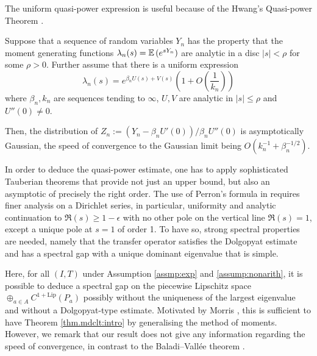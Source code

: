 \documentclass[12pt,a4paper,reqno]{amsart}
\newcommand{\tcb}{\textcolor{blue}}
\begin{document}
The uniform quasi-power expression is useful because of the Hwang's Quasi-power Theorem \cite{Hwang}.
\begin{theorem}
Suppose that a sequence of random variables $Y_n$ has the property that the moment generating functions $\lambda_n(s) = {\mathbb E}\,(e^{sY_n})$ are analytic in a disc $|s| < \rho$ for some $\rho >0$. Further assume that there is a uniform expression
\[
\lambda_n(s) = e^{\beta_n  U(s) + V(s)}\left( 1 + O\left(\frac{1}{k_n} \right)\right)
\]
where $\beta_n, k_n$ are sequences tending to $\infty$, $U,V$ are analytic in $|s| \le \rho$ and $U''(0) \neq 0$.

Then, the distribution of $Z_n :=  (Y_n - \beta_n U'(0))/ \beta_n U''(0)$ is asymptotically Gaussian, the speed of convergence to the Gaussian limit being $O(k_n^{-1} + \beta_n^{-1/2})$.
\end{theorem}

In order to deduce the quasi-power estimate, one has to apply sophisticated Tauberian theorems that provide not just an upper bound, but also an asymptotic of precisely the right order. The use of Perron's formula  in  \cite{baladi-vallee} requires finer analysis on a Dirichlet series, in particular, uniformity and analytic continuation to $\Re(s)\geq 1-\epsilon$ with no other pole on the vertical line $\Re(s)=1$, except a unique pole at $s=1$ of order 1. To have so,  strong spectral properties are needed, namely  that the transfer operator satisfies the Dolgopyat estimate and has a spectral gap with a unique dominant eigenvalue that is simple.



Here, for all $(I,T)$ under Assumption \ref{assmp:exp} and \ref{assump:nonarith}, it is possible to deduce a spectral gap on the piecewise Lipschitz space $\oplus_{a \in A} C^{1+\mathrm{Lip}}(P_a)$ possibly without the uniqueness of the largest eigenvalue and  without 
a Dolgopyat-type estimate. Motivated by Morris \cite{morris}, this is sufficient to have Theorem \ref{thm.mdclt:intro} by generalising the method of moments. However, we remark that our result does not give any information regarding the speed of convergence, in contrast to the Baladi--Vall\'ee theorem \cite{baladi-vallee}. 
\end{document}
